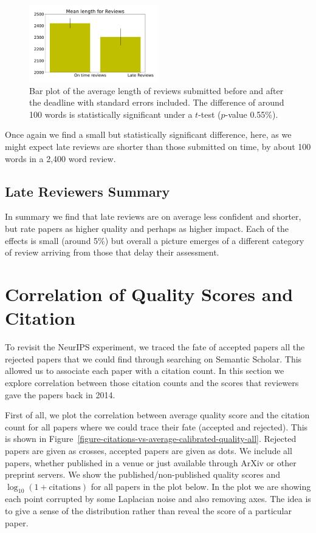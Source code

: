 \begin{figure}[htb]
\centering
\includegraphics[width=0.50\textwidth]{diagrams/neurips/review-length-early-late.pdf}

\caption{Bar plot of the average length of reviews
submitted before and after the deadline with standard errors included.
The difference of around 100 words is statistically significant under a
\(t\)-test (\(p\)-value 0.55\%).} \label{review-length-early-late}
\end{figure}

Once again we find a small but statistically significant difference,
here, as we might expect late reviews are shorter than those submitted
on time, by about 100 words in a 2,400 word review.


\subsection{Late Reviewers Summary}\label{late-reviewers-summary}

In summary we find that late reviews are on average less confident and
shorter, but rate papers as higher quality and perhaps as higher impact.
Each of the effects is small (around 5\%) but overall a picture emerges
of a different category of review arriving from those that delay their
assessment.

\section{Correlation of Quality Scores and
Citation}\label{correlation-of-quality-scores-and-citation}

To revisit the NeurIPS experiment, we traced the fate of accepted papers all the rejected papers that we could find through searching on Semantic Scholar. This allowed us to associate each paper with a citation count. In this section we explore correlation between those citation counts and the scores that reviewers gave the papers back in 2014.

First of all, we plot the correlation between average quality score and the citation count for all papers where we could trace their fate (accepted and rejected). This is shown in  Figure~\ref{figure-citations-vs-average-calibrated-quality-all}. Rejected papers are given as crosses,
accepted papers are given as dots. We include all papers, whether
published in a venue or just available through ArXiv or other preprint
servers. We show the published/non-published quality scores and
\(\log_{10}(1+\text{citations})\) for all papers in the plot below. In
the plot we are showing each point corrupted by some Laplacian noise and
also removing axes. The idea is to give a sense of the distribution
rather than reveal the score of a particular paper.

